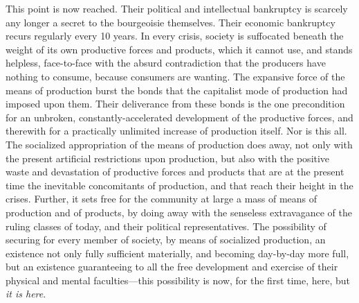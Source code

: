 This point is now reached. Their political and intellectual bankruptcy is
scarcely any longer a secret to the bourgeoisie themselves. Their economic
bankruptcy recurs regularly every 10 years. In every crisis, society is
suffocated beneath the weight of its own productive forces and products, which
it cannot use, and stands helpless, face-to-face with the absurd contradiction
that the producers have nothing to consume, because consumers are wanting. The
expansive force of the means of production burst the bonds that the capitalist
mode of production had imposed upon them. Their deliverance from these bonds is
the one precondition for an unbroken, constantly-accelerated development of the
productive forces, and therewith for a practically unlimited increase of
production itself. Nor is this all. The socialized appropriation of the means of
production does away, not only with the present artificial restrictions upon
production, but also with the positive waste and devastation of productive
forces and products that are at the present time the inevitable concomitants of
production, and that reach their height in the crises. Further, it sets free for
the community at large a mass of means of production and of products, by doing
away with the senseless extravagance of the ruling classes of today, and their
political representatives. The possibility of securing for every member of
society, by means of socialized production, an existence not only fully
sufficient materially, and becoming day-by-day more full, but an existence
guaranteeing to all the free development and exercise of their physical and
mental faculties---this possibility is now, for the first time, here, but
\emph{it is here}.

